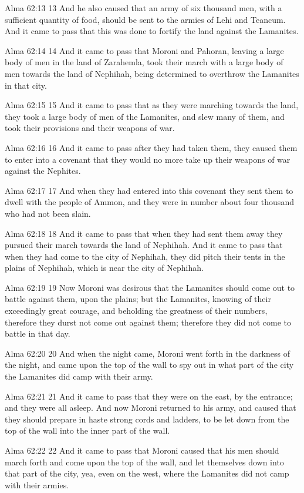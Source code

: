 Alma 62:13
 13 And he also caused that an army of six thousand men, with a
sufficient quantity of food, should be sent to the armies of Lehi
and Teancum. And it came to pass that this was done to fortify
the land against the Lamanites.

Alma 62:14
 14 And it came to pass that Moroni and Pahoran, leaving a large
body of men in the land of Zarahemla, took their march with a
large body of men towards the land of Nephihah, being determined
to overthrow the Lamanites in that city.

Alma 62:15
 15 And it came to pass that as they were marching towards the
land, they took a large body of men of the Lamanites, and slew
many of them, and took their provisions and their weapons of war.

Alma 62:16
 16 And it came to pass after they had taken them, they caused
them to enter into a covenant that they would no more take up
their weapons of war against the Nephites.

Alma 62:17
 17 And when they had entered into this covenant they sent them
to dwell with the people of Ammon, and they were in number about
four thousand who had not been slain.

Alma 62:18
 18 And it came to pass that when they had sent them away they
pursued their march towards the land of Nephihah. And it came to
pass that when they had come to the city of Nephihah, they did
pitch their tents in the plains of Nephihah, which is near the
city of Nephihah.

Alma 62:19
 19 Now Moroni was desirous that the Lamanites should come out to
battle against them, upon the plains; but the Lamanites, knowing
of their exceedingly great courage, and beholding the greatness
of their numbers, therefore they durst not come out against them;
therefore they did not come to battle in that day.

Alma 62:20
 20 And when the night came, Moroni went forth in the darkness of
the night, and came upon the top of the wall to spy out in what
part of the city the Lamanites did camp with their army.

Alma 62:21
 21 And it came to pass that they were on the east, by the
entrance; and they were all asleep. And now Moroni returned to
his army, and caused that they should prepare in haste strong
cords and ladders, to be let down from the top of the wall into
the inner part of the wall.

Alma 62:22
 22 And it came to pass that Moroni caused that his men should
march forth and come upon the top of the wall, and let themselves
down into that part of the city, yea, even on the west, where the
Lamanites did not camp with their armies.

